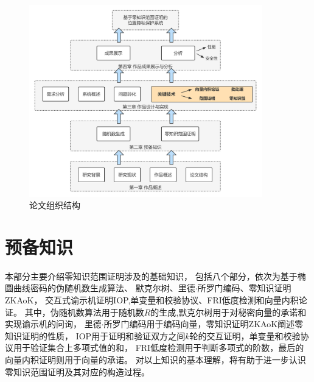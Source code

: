 \documentclass[zihao=-4]{ctexart}
\begin{document}
\begin{figure}[H] %
	\centering %
	\includegraphics[width=0.9\textwidth]{./include_picture/2023冯如杯-论文组织结构} %
	\caption{论文组织结构} %
	\label{论文组织结构} %
\end{figure}

\section{预备知识}
本部分主要介绍零知识范围证明涉及的基础知识，
包括八个部分，依次为基于椭圆曲线密码的伪随机数生成算法、
默克尔树、里德$\cdot$所罗门编码、零知识证明ZKAoK，
交互式谕示机证明IOP,单变量和校验协议、FRI低度检测和向量内积论证。
其中，伪随机数算法用于随机数$R$的生成,默克尔树用于对秘密向量的承诺和实现谕示机的问询，
里德$\cdot$所罗门编码用于编码向量，零知识证明ZKAoK阐述零知识证明的性质，
IOP用于证明和验证双方之间$k$轮的交互证明，单变量和校验协议用于验证集合上多项式值的和，
FRI低度检测用于判断多项式的阶数，最后的向量内积证明则用于向量的承诺。
对以上知识的基本理解，将有助于进一步认识零知识范围证明及其对应的构造过程。
\end{document}
